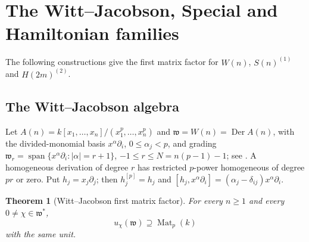 \documentclass[11pt,reqno]{amsart}
\newtheorem{theorem}{Theorem}[section]
\theoremstyle{definition}
\theoremstyle{remark}
\theoremstyle{definition}
\newcommand{\Mat}{\operatorname{Mat}}
\newcommand{\spn}{\operatorname{span}}
\begin{document}
\section{The Witt--Jacobson, Special and Hamiltonian families}\label{sec:wsh}

The following constructions give the first matrix factor for
$W(n)$, $S(n)^{(1)}$ and $H(2m)^{(2)}$.

\subsection{The Witt--Jacobson algebra}

Let $A(n)=k[x_1,\ldots,x_n]/(x_1^p,\ldots,x_n^p)$ and
$\mathfrak w=W(n)=\operatorname{Der}A(n)$, with the divided-monomial basis
$x^\alpha\partial_i$, $0\le\alpha_j<p$, and grading
$\mathfrak w_r=\spn\{x^\alpha\partial_i:|\alpha|=r+1\}$,
$-1\le r\le N=n(p-1)-1$; see \cite[Section~2]{Mygind2014}.  A homogeneous
derivation of degree $r$ has restricted $p$-power homogeneous of degree $pr$
or zero.  Put $h_j=x_j\partial_j$; then $h_j^{[p]}=h_j$ and
$[h_j,x^\alpha\partial_i]=(\alpha_j-\delta_{ij})x^\alpha\partial_i$.

\begin{theorem}[Witt--Jacobson first matrix factor]\label{thm:witt-first-matrix}
For every $n\ge1$ and every $0\ne\chi\in\mathfrak w^*$,
\[
 u_\chi(\mathfrak w)\supseteq\Mat_p(k)
\]
with the same unit.
\end{theorem}
\end{document}
